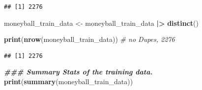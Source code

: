 \documentclass[
]{article}
\newenvironment{Shaded}{\begin{snugshade}}{\end{snugshade}}
\newcommand{\CommentTok}[1]{\textcolor[rgb]{0.56,0.35,0.01}{\textit{#1}}}
\newcommand{\DocumentationTok}[1]{\textcolor[rgb]{0.56,0.35,0.01}{\textbf{\textit{#1}}}}
\newcommand{\FunctionTok}[1]{\textcolor[rgb]{0.13,0.29,0.53}{\textbf{#1}}}
\newcommand{\NormalTok}[1]{#1}
\newcommand{\OtherTok}[1]{\textcolor[rgb]{0.56,0.35,0.01}{#1}}
\newcommand{\SpecialCharTok}[1]{\textcolor[rgb]{0.81,0.36,0.00}{\textbf{#1}}}
\begin{document}
\begin{verbatim}
## [1] 2276
\end{verbatim}

\begin{Shaded}
\begin{Highlighting}[]
\NormalTok{moneyball\_train\_data }\OtherTok{\textless{}{-}}\NormalTok{ moneyball\_train\_data }\SpecialCharTok{|\textgreater{}} \FunctionTok{distinct}\NormalTok{()}

\FunctionTok{print}\NormalTok{(}\FunctionTok{nrow}\NormalTok{(moneyball\_train\_data)) }\CommentTok{\# no Dupes, 2276}
\end{Highlighting}
\end{Shaded}

\begin{verbatim}
## [1] 2276
\end{verbatim}

\begin{Shaded}
\begin{Highlighting}[]
\DocumentationTok{\#\#\# Summary Stats of the training data. }
\FunctionTok{print}\NormalTok{(}\FunctionTok{summary}\NormalTok{(moneyball\_train\_data))}
\end{Highlighting}
\end{Shaded}
\end{document}
